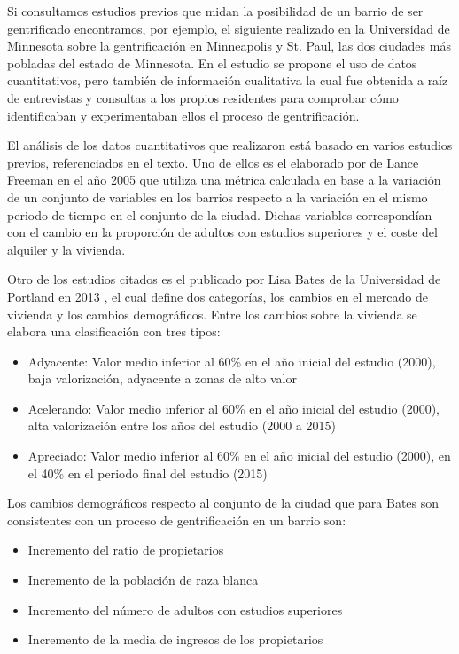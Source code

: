 \documentclass[12pt,a4paper,twoside]{book}
\begin{document}
Si consultamos estudios previos que midan la posibilidad de un barrio de ser gentrificado encontramos, por ejemplo, el siguiente realizado en la Universidad de Minnesota \cite{goetz_diversity_2019} sobre la gentrificación en Minneapolis y St. Paul, las dos ciudades más pobladas del estado de Minnesota. En el estudio se propone el uso de datos cuantitativos, pero también de información cualitativa la cual fue obtenida a raíz de entrevistas y consultas a los propios residentes para comprobar cómo identificaban y experimentaban ellos el proceso de gentrificación. 

El análisis de los datos cuantitativos que realizaron está basado en varios estudios previos, referenciados en el texto. Uno de ellos es el elaborado por de Lance Freeman en el año 2005 \cite{freeman_displacement_2005} que utiliza una métrica calculada en base a la variación de un conjunto de variables en los barrios respecto a la variación en el mismo periodo de tiempo en el conjunto de la ciudad. Dichas variables correspondían con el cambio en la proporción de adultos con estudios superiores y el coste del alquiler y la vivienda.

Otro de los estudios citados es el publicado por Lisa Bates de la Universidad de Portland en 2013 \cite{bates_gentrification_2013}, el cual define dos categorías, los cambios en el mercado de vivienda y los cambios demográficos. Entre los cambios sobre la vivienda se elabora una clasificación con tres tipos:
\begin{itemize}
    \item Adyacente: Valor medio inferior al 60\% en el año inicial del estudio (2000), baja valorización, adyacente a zonas de alto valor
    \item Acelerando: Valor medio inferior al 60\% en el año inicial del estudio (2000), alta valorización entre los años del estudio (2000 a 2015)
    \item Apreciado: Valor medio inferior al 60\% en el año inicial del estudio (2000), en el 40\% en el periodo final del estudio (2015)
\end{itemize}

Los cambios demográficos respecto al conjunto de la ciudad que para Bates son consistentes con un proceso de gentrificación en un barrio son:
\begin{itemize}
    \item Incremento del ratio de propietarios
    \item Incremento de la población de raza blanca
    \item Incremento del número de adultos con estudios superiores
    \item Incremento de la media de ingresos de los propietarios
\end{itemize}
\end{document}
